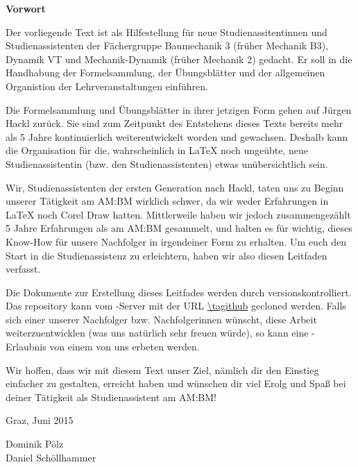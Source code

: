 {\huge \textbf{Vorwort}}\\
\vspace{8mm}

Der vorliegende Text ist als Hilfestellung für neue Studienassitentinnen und
Studienassistenten der Fächergruppe Baumechanik 3 (früher Mechanik B3), Dynamik
VT und Mechanik-Dynamik (früher Mechanik 2) gedacht. Er soll in die Handhabung
der Formelsammlung, der Übungsblätter und der allgemeinen Organistion der 
Lehrveranstaltungen einführen.

Die Formelsammlung und Übungsblätter in ihrer jetzigen Form gehen auf
Jürgen Hackl %
zurück. Sie sind zum Zeitpunkt des Entstehens
dieses Texts bereits mehr als 5 Jahre kontinuierlich weiterentwickelt worden und
gewachsen. Deshalb kann die Organisation für die, wahrscheinlich in \LaTeX{}
noch ungeübte, neue Studienassistentin (bzw. den Studienassistenten) etwas 
unübersichtlich sein.

Wir, Studienassistenten der ersten \glqq{}Generation\grqq{} nach Hackl, taten
uns zu Beginn unserer Tätigkeit am AM:BM wirklich schwer, da wir weder 
Erfahrungen in \LaTeX{} noch Corel Draw hatten. Mittlerweile haben wir jedoch
zusammengezählt 5 Jahre Erfahrungen als am AM:BM gesammelt, und halten es für
wichtig, dieses Know-How für unsere Nachfolger in irgendeiner Form zu erhalten.
Um euch den Start in die Studienassistenz zu erleichtern, haben wir also diesen
Leitfaden verfasst.

Die Dokumente zur Erstellung dieses Leitfades werden durch  
versionskontrolliert. Das repository kann vom -Server mit der
URL \url{\tagithub} gecloned werden. Falls sich einer unserer Nachfolger bzw.
Nachfolgerinnen wünscht, diese Arbeit weiterzuentwicklen (was uns natürlich 
sehr freuen würde), so kann eine -Erlaubnis von einem von uns
erbeten werden.

Wir hoffen, dass wir mit diesem Text unser Ziel, nämlich dir den Einstieg
einfacher zu gestalten, erreicht haben und wünschen dir viel Erolg und Spaß bei
deiner Tätigkeit als Studienassistent am AM:BM!

\begin{flushleft}
Graz, Juni 2015 
\end{flushleft}
\begin{flushright}
Dominik Pölz\\Daniel Schöllhammer
\end{flushright}

